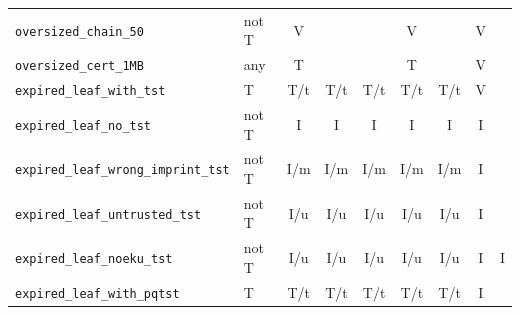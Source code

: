 {\begin{longtable}{>{\raggedright\arraybackslash}p{4.2cm}p{1.2cm}ccccccc}
\texttt{oversized\_\allowbreak{}chain\_\allowbreak{}50} & not T & V &  &  & V &  & V & \\
\texttt{oversized\_\allowbreak{}cert\_\allowbreak{}1MB} & any & T &  &  & T &  & V & \\
\texttt{expired\_\allowbreak{}leaf\_\allowbreak{}with\_\allowbreak{}tst} & T & T/t & T/t & T/t & T/t & T/t & V & \\
\texttt{expired\_\allowbreak{}leaf\_\allowbreak{}no\_\allowbreak{}tst} & not T & I & I & I & I & I & I & \\
\texttt{expired\_\allowbreak{}leaf\_\allowbreak{}wrong\_\allowbreak{}imprint\_\allowbreak{}tst} & not T & I/m & I/m & I/m & I/m & I/m & I & \\
\texttt{expired\_\allowbreak{}leaf\_\allowbreak{}untrusted\_\allowbreak{}tst} & not T & I/u & I/u & I/u & I/u & I/u & I & \\
\texttt{expired\_\allowbreak{}leaf\_\allowbreak{}noeku\_\allowbreak{}tst} & not T & I/u & I/u & I/u & I/u & I/u & I & I\\
\texttt{expired\_\allowbreak{}leaf\_\allowbreak{}with\_\allowbreak{}pqtst} & T & T/t & T/t & T/t & T/t & T/t & I & \\
\end{longtable}
}
